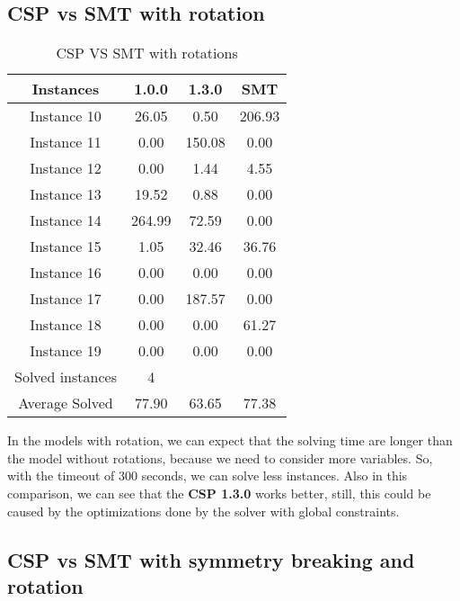 \subsection{CSP vs SMT with rotation}

\begin{table}[!h]
    \centering
    \begin{tabular}{|c|c|c|c|}\hline
        Instances               & 1.0.0  & 1.3.0  & SMT    \\ \hline
        Instance 10             & 26.05  & 0.50   & 206.93 \\ \hline
        Instance 11             & 0.00   & 150.08 & 0.00   \\ \hline
        Instance 12             & 0.00   & 1.44   & 4.55   \\ \hline
        Instance 13             & 19.52  & 0.88   & 0.00   \\ \hline
        Instance 14             & 264.99 & 72.59  & 0.00   \\ \hline
        Instance 15             & 1.05   & 32.46  & 36.76  \\ \hline
        Instance 16             & 0.00   & 0.00   & 0.00   \\ \hline
        Instance 17             & 0.00   & 187.57 & 0.00   \\ \hline
        Instance 18             & 0.00   & 0.00   & 61.27  \\ \hline
        Instance 19             & 0.00   & 0.00   & 0.00   \\ \hline
        Solved   instances      &  4     &       &       \\ \hline
        Average   Solved        &  77.90   &  63.65   &  77.38   \\ \hline
    \end{tabular}
    \caption{CSP VS SMT with rotations}
    \label{tab:csp-smt-with-rot-comparison}
\end{table}
In the models with rotation, we can expect that the solving time are longer than the model without rotations, because we need to consider more variables.
So, with the timeout of 300 seconds, we can solve less instances. 
Also in this comparison, we can see that the \textbf{CSP 1.3.0} works better, still, this could be caused by the optimizations done by the solver with global constraints. \\
\subsection{CSP vs SMT with symmetry breaking and rotation}

